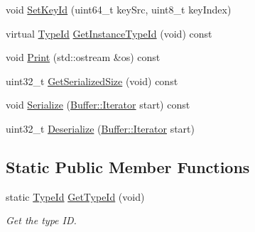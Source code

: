 \begin{DoxyCompactItemize}
\item 
void \hyperlink{classns3_1_1LrWpanMacHeader_acd9d1cf7720b9498acf78dc040a53971}{Set\+Key\+Id} (uint64\+\_\+t key\+Src, uint8\+\_\+t key\+Index)
\item 
virtual \hyperlink{classns3_1_1TypeId}{Type\+Id} \hyperlink{classns3_1_1LrWpanMacHeader_a3d026ec1d3ccd962dac373a55a1e9754}{Get\+Instance\+Type\+Id} (void) const 
\item 
void \hyperlink{classns3_1_1LrWpanMacHeader_a286cb3ad1e9663fce247543c50465aa2}{Print} (std\+::ostream \&os) const 
\item 
uint32\+\_\+t \hyperlink{classns3_1_1LrWpanMacHeader_a60764b3f460b2d918840266ebace9b2b}{Get\+Serialized\+Size} (void) const 
\item 
void \hyperlink{classns3_1_1LrWpanMacHeader_ab68c4cf99f2c46ed910f8aec2bc3b61b}{Serialize} (\hyperlink{classns3_1_1Buffer_1_1Iterator}{Buffer\+::\+Iterator} start) const 
\item 
uint32\+\_\+t \hyperlink{classns3_1_1LrWpanMacHeader_aab33c3f99445389aba5e08b45189c873}{Deserialize} (\hyperlink{classns3_1_1Buffer_1_1Iterator}{Buffer\+::\+Iterator} start)
\end{DoxyCompactItemize}
\subsection*{Static Public Member Functions}
\begin{DoxyCompactItemize}
\item 
static \hyperlink{classns3_1_1TypeId}{Type\+Id} \hyperlink{classns3_1_1LrWpanMacHeader_a62c501de76e52077d4619789e8a5903a}{Get\+Type\+Id} (void)
\begin{DoxyCompactList}\small\item\em Get the type ID. \end{DoxyCompactList}\end{DoxyCompactItemize}
